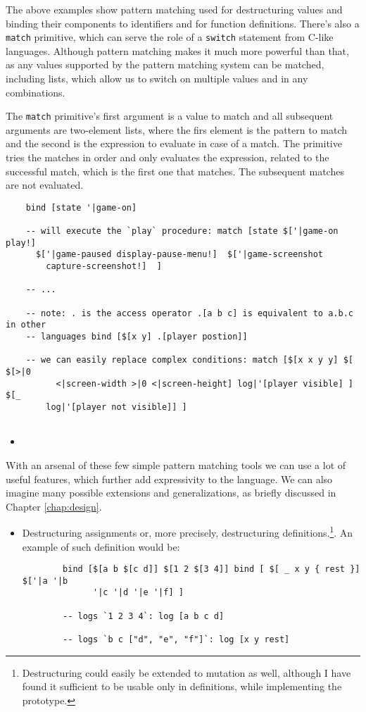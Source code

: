 The above examples show pattern matching used for destructuring values and
binding their components to identifiers and for function definitions. There's
also a \texttt{match} primitive, which can serve the role of a \texttt{switch}
statement from C-like languages. Although pattern matching makes it much more
powerful than that, as any values supported by the pattern matching system can
be matched, including lists, which allow us to switch on multiple values and in
any combinations.

The \texttt{match} primitive's first argument is a value to match and all
subsequent arguments are two-element lists, where the firs element is the
pattern to match and the second is the expression to evaluate in case of a
match. The primitive tries the matches in order and only evaluates the
expression, related to the successful match, which is the first one that
matches. The subsequent matches are not evaluated.

\begin{lstlisting}
    bind [state '|game-on]
    
    -- will execute the `play` procedure: match [state $['|game-on play!]
      $['|game-paused display-pause-menu!]  $['|game-screenshot
        capture-screenshot!]  ]
    
    -- ...

    -- note: . is the access operator .[a b c] is equivalent to a.b.c in other
    -- languages bind [$[x y] .[player postion]]
    
    -- we can easily replace complex conditions: match [$[x x y y] $[ $[>|0
          <|screen-width >|0 <|screen-height] log|'[player visible] ] $[_
        log|'[player not visible]] ]
    
\end{lstlisting}
\begin{itemize}
    \item 
\end{itemize}

With an arsenal of these few simple pattern matching tools we can use a lot of
useful features, which further add expressivity to the language. We can also
imagine many possible extensions and generalizations, as briefly discussed in
Chapter \ref{chap:design}.

\begin{itemize}
    \item Destructuring assignments or, more precisely, destructuring
      definitions.\footnote{Destructuring could easily be extended to mutation
        as well, although I have found it sufficient to be usable only in
        definitions, while implementing the prototype.}. An example of such
      definition would be:
    \begin{lstlisting}
        bind [$[a b $[c d]] $[1 2 $[3 4]] bind [ $[ _ x y { rest }] $['|a '|b
              '|c '|d '|e '|f] ]
        
        -- logs `1 2 3 4`: log [a b c d]
        
        -- logs `b c ["d", "e", "f"]`: log [x y rest]
    \end{lstlisting}
\end{itemize}


